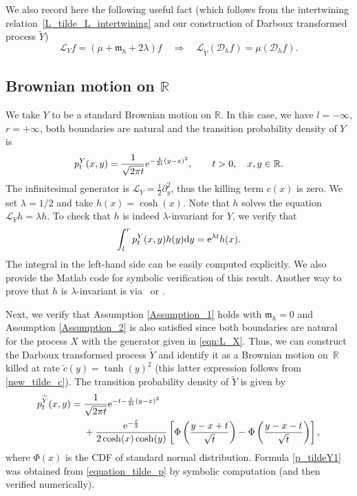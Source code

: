 \documentclass[10pt,a4paper]{amsart}
\numberwithin{equation}{section}
\theoremstyle{definition}
\def\L{{\mathcal L}}
\def\r{{\mathbb R}}
\def\d{{\textnormal d}}
\begin{document}
We also record here the following useful fact \big(which follows from the intertwining relation~\eqref{L_tilde_L_intertwining} and our construction of Darboux transformed process $\widetilde Y$\big)
\begin{equation}\label{g_f_intertwining}
  \L_Y f=(\mu+ {\mathfrak m}_h + 2\lambda) f
 \quad \Longrightarrow \quad \L_{\widetilde Y} ({\mathcal D}_h f)=\mu ({\mathcal D}_h f).
\end{equation}

\subsection[Brownian motion on R]{Brownian motion on $\boldsymbol{\r}$}\label{example1}

We take $Y$ to be a standard Brownian motion on $\r$. In this case, we have $l=-\infty$, $r=+\infty$, both boundaries are natural and the transition probability density of $Y$ is
\[
p^Y_t(x,y)=\frac{1}{\sqrt{2\pi t}} {\rm e}^{-\frac{1}{2t} (y-x)^2},\qquad t>0, \quad x,y \in \r.
\]
The infinitesimal generator is $\L_Y=\frac{1}{2} \partial_y^2$, thus the killing term $c(x)$ is zero.
We set $\lambda=1/2$ and take $h(x)=\cosh(x)$. Note that $h$ solves the equation $\L_Y h= \lambda h$. To check that $h$ is indeed $\lambda$-invariant for $Y$, we verify that
\begin{equation}\label{lambda_invariant_h}
\int^r_{l} p^Y_t(x,y) h(y) \d y={\rm e}^{\lambda t} h(x).
\end{equation}
The integral in the left-hand side can be easily computed explicitly. We also provide the {\sc Matlab} code for symbolic verification of this result. Another way to prove that $h$ is $\lambda$-invariant is via~\cite[Theorem 2.7]{Rogers_2021} or \cite[Corollary 2.2]{Mijatovic_2012}.

Next, we verify that Assumption \ref{Assumption_1} holds with ${\mathfrak m}_h=0$ and Assumption \ref{Assumption_2} is also satisfied since both boundaries are natural for the process $X$ with the generator given in \eqref{eqn:L_X}. Thus, we can construct the Darboux transformed process $\widetilde Y$ and identify it as a Brownian motion on~$\r$ killed at rate $\tilde c(y)=\tanh(y)^2$ (this latter expression follows from \eqref{new_tilde_c}).
The transition probability density of $\widetilde Y$ is given by
\begin{align}
p^{\widetilde Y}_t(x,y)={}&\frac{1}{\sqrt{2\pi t}} {\rm e}^{-t-\frac{1}{2t}(y-x)^2}\nonumber\\
&
+ \frac{{\rm e}^{-\frac{t}{2}}}{2\cosh(x) \cosh(y)} \left[
\Phi\left( \frac{y-x+t}{\sqrt{t}} \right) - \Phi\left( \frac{y-x-t}{\sqrt{t}} \right)\right],\label{p_tildeY1}
\end{align}
where $\Phi(x)$ is the CDF of standard normal distribution. Formula \eqref{p_tildeY1} was obtained from
\eqref{equation_tilde_p} by symbolic computation (and then verified numerically).
\end{document}
